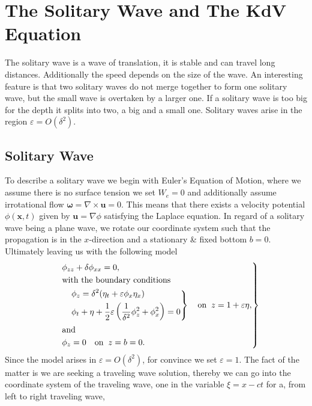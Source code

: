 \section{The Solitary Wave and The KdV Equation}
The solitary wave is a wave of translation, it is stable and can travel long
distances. Additionally the speed depends on the size of the wave. An
interesting feature is that two solitary waves do not merge together to form
one solitary wave, but the small wave is overtaken by a larger one. If a
solitary wave is too big for the depth it splits into two, a big and a small
one. Solitary waves arise in the region $\varepsilon=O(\delta^2)$.


\subsection{Solitary Wave}
To describe
a solitary wave we begin with Euler's Equation of Motion, where we assume
there is no surface tension we set $W_e = 0$ and additionally assume
irrotational flow $\mathbf{\omega}=\nabla \times  \mathbf{u} = 0$. This means
that there exists a velocity potential $\phi(\mathbf{x},t)$ given
by $\mathbf{u} = \nabla \phi$ satisfying the Laplace equation. In regard of a
solitary wave being a plane wave, we rotate our coordinate system such that
the propagation is in the $x$-direction and a stationary \& fixed bottom
$b=0$. Ultimately leaving us with the following model
\begin{align}\label{eq:soliton}
\begin{drcases}
   & \phi_{zz} + \delta \phi_{x x }  = 0,\\
   &\text{with the boundary conditions}\\
   &\begin{drcases}
    &\phi_z = \delta^2 (\eta_t + \varepsilon \phi_x \eta_x) \\
    &\phi_t + \eta +  \frac{1}{2}\varepsilon\left( \frac{1}{\delta^2}\phi^2_z
    + \phi_x^2\right)  =0
  \end{drcases}\quad \text{on}\;\; z = 1+\varepsilon\eta,\\
   &\text{and}\\
   & \phi_z =0 \quad \text{on}\;\; z = b = 0.
\end{drcases}
\end{align}
Since the model arises in $\varepsilon = O(\delta^2)$, for convince we set
$\varepsilon=1$. The fact of the matter is we are seeking a traveling wave
solution, thereby we can go into the coordinate system of the traveling wave,
one in the variable $\xi = x - ct$ for a, from left to right traveling wave,
